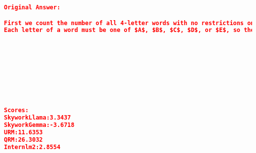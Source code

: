 \begin{lstlisting}[language=json,numbers=none]
Original Answer:

First we count the number of all 4-letter words with no restrictions on the word. Then we count the number of 4-letter words with no consonants. We then subtract to get the answer.
Each letter of a word must be one of $A$, $B$, $C$, $D$, or $E$, so the number of 4-letter words with no restrictions on the word is $5\times 5\times 5\times 5=625$.  Each letter of a word with no consonant must be one of $A$ or $E$. So the number of all 4-letter words with no consonants is $2\times 2\times 2\times 2=16$.  Therefore, the number of 4-letter words with at least one consonant is $625-16=609$.








  
Scores:
SkyworkLlama:3.3437
SkyworkGemma:-3.6718
URM:11.6353
QRM:26.3032
Internlm2:2.8554
\end{lstlisting}